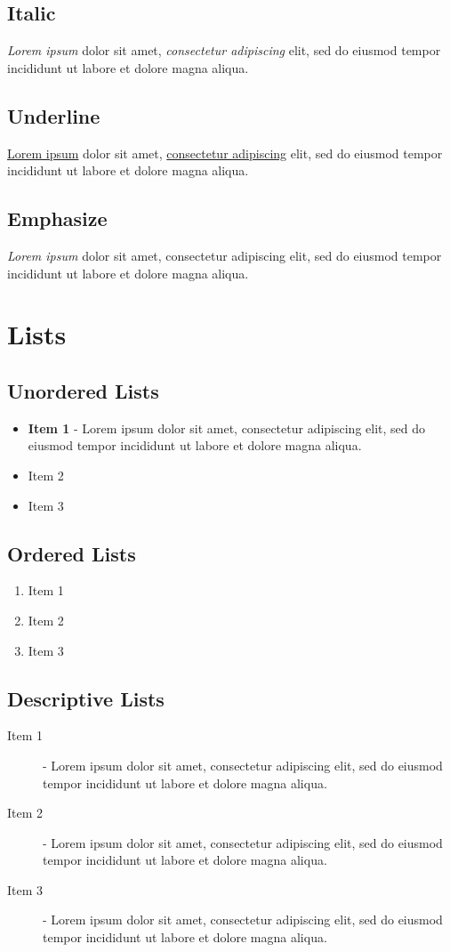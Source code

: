\documentclass[a4paper, 12pt]{report}
\begin{document}
\section{Italic}
\textit{Lorem ipsum} dolor sit amet, \textit{consectetur adipiscing} elit, sed do eiusmod tempor incididunt ut labore et dolore magna aliqua.

\section{Underline}
\underline{Lorem ipsum} dolor sit amet, \underline{consectetur adipiscing} elit, sed do eiusmod tempor incididunt ut labore et dolore magna aliqua.

\section{Emphasize}
\emph{Lorem ipsum} dolor sit amet, consectetur adipiscing elit, sed do eiusmod tempor incididunt ut labore et dolore magna aliqua.



\chapter{Lists}
\section{Unordered Lists}
\begin{itemize}
	\item \textbf{Item 1} - Lorem ipsum dolor sit amet, consectetur adipiscing elit, sed do eiusmod tempor incididunt ut labore et dolore magna aliqua.
	\item Item 2
	\item Item 3
\end{itemize}

\section{Ordered Lists}
\begin{enumerate}
	\item Item 1
	\item Item 2
	\item Item 3
\end{enumerate}

\section{Descriptive Lists}
\begin{description}
	\item[Item 1] - Lorem ipsum dolor sit amet, consectetur adipiscing elit, sed do eiusmod tempor incididunt ut labore et dolore magna aliqua.
	\item[Item 2] - Lorem ipsum dolor sit amet, consectetur adipiscing elit, sed do eiusmod tempor incididunt ut labore et dolore magna aliqua.
	\item[Item 3] - Lorem ipsum dolor sit amet, consectetur adipiscing elit, sed do eiusmod tempor incididunt ut labore et dolore magna aliqua.
\end{description}
\end{document}
